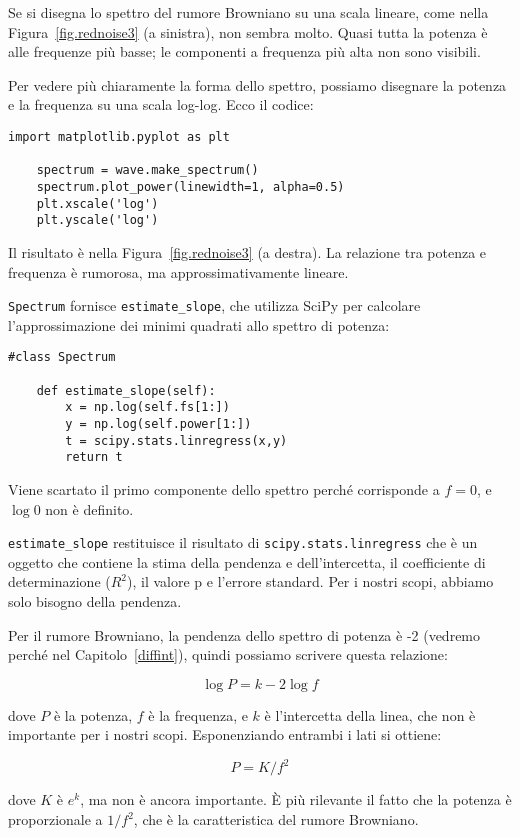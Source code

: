 \documentclass[12pt,a4paper]{book}
\begin{document}
Se si disegna lo spettro del rumore Browniano su una scala lineare, come nella Figura~\ref{fig.rednoise3} (a sinistra), non sembra molto. Quasi tutta la potenza è alle frequenze più basse; le componenti a frequenza più alta non sono visibili.

Per vedere più chiaramente la forma dello spettro, possiamo disegnare la potenza e la frequenza su una scala log-log. Ecco il codice:

\begin{verbatim} 
import matplotlib.pyplot as plt

    spectrum = wave.make_spectrum()
    spectrum.plot_power(linewidth=1, alpha=0.5)
    plt.xscale('log')
    plt.yscale('log')
 \end{verbatim} 

Il risultato è nella Figura~\ref{fig.rednoise3} (a destra). La relazione tra potenza e frequenza è rumorosa, ma approssimativamente lineare.

{\tt Spectrum} fornisce \verb"estimate_slope", che utilizza SciPy per calcolare l'approssimazione dei minimi quadrati allo spettro di potenza:

\begin{verbatim} 
#class Spectrum

    def estimate_slope(self):
        x = np.log(self.fs[1:])
        y = np.log(self.power[1:])
        t = scipy.stats.linregress(x,y)
        return t
 \end{verbatim} 

Viene scartato il primo componente dello spettro perché corrisponde a $f=0$, e $\log 0$ non è definito.

\verb"estimate_slope" restituisce il risultato di {\tt scipy.stats.linregress} che è un oggetto che contiene la stima della pendenza e dell'intercetta, il coefficiente di determinazione ($R^2$), il valore p e l'errore standard. Per i nostri scopi, abbiamo solo bisogno della pendenza.

Per il rumore Browniano, la pendenza dello spettro di potenza è -2 (vedremo perché nel Capitolo~\ref{diffint}), quindi possiamo scrivere questa relazione:

%
\[ \log P = k -2 \log f \] 

%
dove $P$ è la potenza, $f$ è la frequenza, e $k$ è l'intercetta della linea, che non è importante per i nostri scopi. Esponenziando entrambi i lati si ottiene:

%
\[ P = K / f^{2} \] 

%
dove $K$ è $e^k$, ma non è ancora importante. È più rilevante il fatto che la potenza è proporzionale a $1/f^2$, che è la caratteristica del rumore Browniano.
\end{document}
